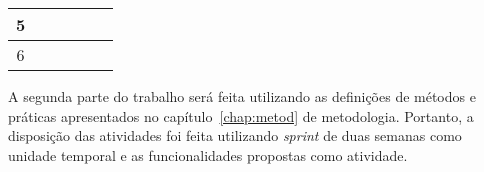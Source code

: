 \begin{table}[H]
\begin{tabular}{|c|l|l|l|l|l|}
    5                                         &                                                                                    &                                                                                    & \cellcolor[HTML]{9B9B9B}                                                          & \cellcolor[HTML]{9B9B9B}                                                           &                                                                                    \\ \hline
    6                                         &                                                                                    &                                                                                    &                                                                                   & \cellcolor[HTML]{9B9B9B}                                                           & \cellcolor[HTML]{9B9B9B}                                                           \\ \hline
  \end{tabular}
\end{table}

A segunda parte do trabalho será feita utilizando as definições de
métodos e práticas apresentados no capítulo~\ref{chap:metod} de metodologia.
Portanto, a disposição das atividades foi feita utilizando \textit{sprint} de
duas semanas como unidade temporal e as funcionalidades propostas como
atividade.

